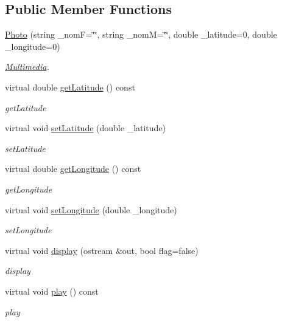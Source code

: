 \subsection*{Public Member Functions}
\begin{DoxyCompactItemize}
\item 
\hyperlink{classPhoto_ac927f9690ec0d6901371ea8171f45853}{Photo} (string \+\_\+nom\+F=\char`\"{}\char`\"{}, string \+\_\+nom\+M=\char`\"{}\char`\"{}, double \+\_\+latitude=0, double \+\_\+longitude=0)
\begin{DoxyCompactList}\small\item\em \hyperlink{classMultimedia}{Multimedia}. \end{DoxyCompactList}\item 
virtual double \hyperlink{classPhoto_a75f9548586cedcbb6639bc74f7559a46}{get\+Latitude} () const 
\begin{DoxyCompactList}\small\item\em get\+Latitude \end{DoxyCompactList}\item 
virtual void \hyperlink{classPhoto_abf629ddab24eb9e5c887ea75b1a283a9}{set\+Latitude} (double \+\_\+latitude)
\begin{DoxyCompactList}\small\item\em set\+Latitude \end{DoxyCompactList}\item 
virtual double \hyperlink{classPhoto_a6e2def6e43b3dd8eee78fcafe34dcaff}{get\+Longitude} () const 
\begin{DoxyCompactList}\small\item\em get\+Longitude \end{DoxyCompactList}\item 
virtual void \hyperlink{classPhoto_a1352b8982d0f72a82abb3f69d798ea01}{set\+Longitude} (double \+\_\+longitude)
\begin{DoxyCompactList}\small\item\em set\+Longitude \end{DoxyCompactList}\item 
virtual void \hyperlink{classPhoto_a7a6e076a522a19422459af9e7f3c958b}{display} (ostream \&out, bool flag=false)
\begin{DoxyCompactList}\small\item\em display \end{DoxyCompactList}\item 
virtual void \hyperlink{classPhoto_a34ef1c73e123d2951e8a08b3b1697c05}{play} () const 
\begin{DoxyCompactList}\small\item\em play \end{DoxyCompactList}\end{DoxyCompactItemize}
